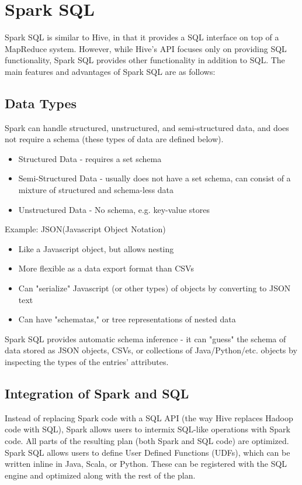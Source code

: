 \documentclass[twoside]{article}
\begin{document}
\section{Spark SQL}
Spark SQL is similar to Hive, in that it provides a SQL interface on top of a MapReduce system. However, while  Hive's API focuses only on providing SQL functionality, Spark SQL provides other functionality in addition to SQL. The main features and advantages of Spark SQL are as follows:

\subsection{Data Types}
Spark can handle structured, unstructured, and semi-structured data, and does not require a schema (these types of data are defined below). 
\begin{itemize}
  \item Structured Data - requires a set schema
  \item Semi-Structured Data - usually does not have a set schema, can consist of a mixture of structured and schema-less data
  \item Unstructured Data - No schema, e.g. key-value stores
\end{itemize}

Example: JSON(Javascript Object Notation)
\begin{itemize}
  \item Like a Javascript object, but allows nesting
  \item More flexible as a data export format than CSVs
  \item Can "serialize" Javascript (or other types) of objects by converting to JSON text
  \item Can have "schematas," or tree representations of nested data
\end{itemize}

Spark SQL provides automatic schema inference - it can "guess" the schema of data stored as JSON objects, CSVs, or collections of Java/Python/etc. objects by inspecting the types of the entries' attributes.

\subsection{Integration of Spark and SQL}
Instead of replacing Spark code with a SQL API (the way Hive replaces Hadoop code with SQL), Spark allows users to intermix SQL-like operations with Spark code. All parts of the resulting plan (both Spark and SQL code) are optimized. Spark SQL allows users to define User Defined Functions (UDFs), which can be written inline in Java, Scala, or Python. These can be registered with the SQL engine and optimized along with the rest of the plan.
\end{document}
